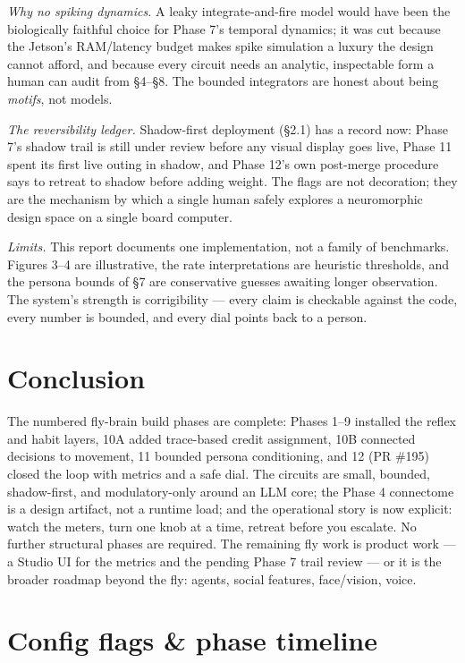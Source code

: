 \documentclass[11pt]{article}
\begin{document}
\emph{Why no spiking dynamics.} A leaky integrate-and-fire model would have been the biologically faithful choice for Phase 7's temporal dynamics; it was cut because the Jetson's RAM/latency budget makes spike simulation a luxury the design cannot afford, and because every circuit needs an analytic, inspectable form a human can audit from §4–§8. The bounded integrators are honest about being \emph{motifs}, not models.

\emph{The reversibility ledger.} Shadow-first deployment (§2.1) has a record now: Phase 7's shadow trail is still under review before any visual display goes live, Phase 11 spent its first live outing in shadow, and Phase 12's own post-merge procedure says to retreat to shadow before adding weight. The flags are not decoration; they are the mechanism by which a single human safely explores a neuromorphic design space on a single board computer.

\emph{Limits.} This report documents one implementation, not a family of benchmarks. Figures 3–4 are illustrative, the rate interpretations are heuristic thresholds, and the persona bounds of §7 are conservative guesses awaiting longer observation. The system's strength is corrigibility — every claim is checkable against the code, every number is bounded, and every dial points back to a person.

\section{Conclusion}

The numbered fly-brain build phases are complete: Phases 1–9 installed the reflex and habit layers, 10A added trace-based credit assignment, 10B connected decisions to movement, 11 bounded persona conditioning, and 12 (PR \#195) closed the loop with metrics and a safe dial. The circuits are small, bounded, shadow-first, and modulatory-only around an LLM core; the Phase 4 connectome is a design artifact, not a runtime load; and the operational story is now explicit: watch the meters, turn one knob at a time, retreat before you escalate. No further structural phases are required. The remaining fly work is product work — a Studio UI for the metrics and the pending Phase 7 trail review — or it is the broader roadmap beyond the fly: agents, social features, face/vision, voice.

\appendix
\section{Config flags \& phase timeline}
\end{document}
